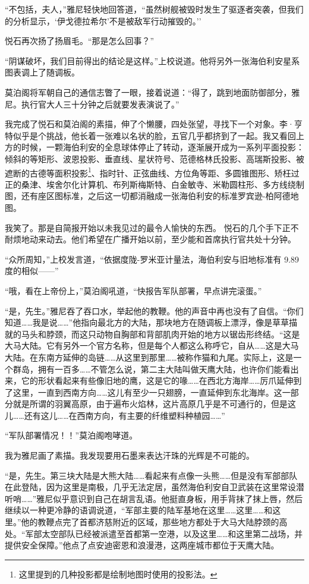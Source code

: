 \documentclass[AutoFakeBold=true]{book}
\begin{document}
``不包括，夫人，''雅尼轻快地回答道，``虽然树舰被毁时发生了驱逐者突袭，但我们的分析显示，`伊戈德拉希尔'不是被敌军行动摧毁的。''

悦石再次扬了扬眉毛。``那是怎么回事？''

``阴谋破坏，我们目前得出的结论是这样。''上校说道。他将另外一张海伯利安星系图表调上了随调板。

莫泊阁将军朝自己的通信志瞥了一眼，接着说道：``得了，跳到地面防御部分，雅尼。执行官大人三十分钟之后就要发表演说了。''

我完成了悦石和莫泊阁的素描，伸了个懒腰，四处张望，寻找下一个对象。李·亨特似乎是个挑战，他长着一张难以名状的脸，五官几乎都挤到了一起。我又看回上方的时候，一颗海伯利安的全息球体停止了转动，逐渐展开成为一系列平面投影：倾斜的等矩形、波恩投影、垂直线、星状符号、范德格林氏投影、高瑞斯投影、被遮断的古德等面积投影\footnote{这里提到的几种投影都是绘制地图时使用的投影法。}、指时针、正弦曲线、方位角等距、多圆锥图形、矫枉过正的桑津、埃舍尔化计算机、布列斯梅斯特、白金敏寺、米勒圆柱形、多方线绕制图，还有座区图标准，之后这一切都消融成一张海伯利安的标准罗宾逊-柏阿德地图。

我笑了。那是自简报开始以未我见过的最令人愉快的东西。 悦石的几个手下正不耐烦地动来动去。他们希望在广播开始以前，至少能和首席执行官共处十分钟。

``众所周知，''上校发言道，``依据度陇-罗米亚计量法，海伯利安与旧地标准有 9.89 度的相似——''

``哦，看在上帝份上，''莫泊阁吼道，``快报告军队部署，早点讲完滚蛋。''

``是，先生。''雅尼吞了吞口水，举起他的教鞭。他的声音中再也没有了自信。``你们知道……我是说……''他指向最北方的大陆，那块地方在随调板上漂浮，像是草草描就的马头和脖颈，而这只动物自胸部和背部肌肉开始的地方以锯齿形终结。``这是大马大陆。它有另外一个官方名称，但是每个人都这么称呼它，自从……这是大马大陆。在东南方延伸的岛链……从这里到那里……被称作猫和九尾。实际上，这是一个群岛，拥有一百多……不管怎么说，第二主大陆叫做天鹰大陆，也许你们能看出来，它的形状看起来有些像旧地的鹰，这是它的喙……在西北方海岸……厉爪延伸到了这里，一直到西南方向……这儿有至少一只翅膀，一直延伸到东北海岸。这一部分就是所谓的羽翼高原，由于遍布火焰林，这片高原几乎是不可通行的，但是这儿……还有这儿……在西南方向，有主要的纤维塑料种植园……''

``军队部署情况！！''莫泊阁咆哮道。

我为雅尼画了素描。我发现要用石墨来表达汗珠的光辉是不可能的。

``是，先生。第三块大陆是大熊大陆……看起来有点像一头熊……但是没有军部部队在此登陆，因为这里是南极，几乎无法定居，虽然海伯利安自卫武装在这里常设潜听哨……''雅尼似乎意识到自己在胡言乱语。他挺直身板，用手背抹了抹上唇，然后继续以一种更冷静的语调说道，``军部主要的陆军基地在这里……这里……和这里。''他的教鞭点完了首都济慈附近的区域，那些地方都处于大马大陆脖颈的高处。``军部太空部队已经被派遣至首都第一空港，以及这里……和这里第二战场，并提供安全保障。''他点了点安迪密恩和浪漫港，这两座城市都位于天鹰大陆。
\end{document}
